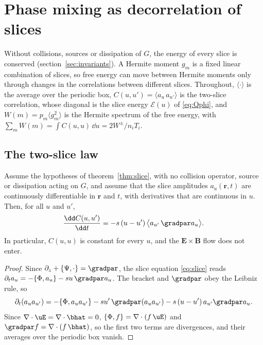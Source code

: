\section{Phase mixing as decorrelation of slices}\label{sec:decorrelation}

Without collisions, sources or dissipation of $G$, the energy of every slice is conserved (section~\ref{sec:invariants}). A Hermite moment $g_m$ is a fixed linear combination of slices, so free energy can move between Hermite moments only through changes in the correlations between different slices. Throughout, $\langle\cdot\rangle$ is the average over the periodic box, $C(u,u')=\langle a_u\,a_{u'}\rangle$ is the two-slice correlation, whose diagonal is the slice energy $\mathcal E(u)$ of \eqref{eq:Qphi}, and $W(m)=p_m\langle g_m^2\rangle$ is the Hermite spectrum of the free energy, with $\sum_mW(m)=\int C(u,u)\,\dd u=2W^\pm/n_iT_i$.

\subsection{The two-slice law}\label{dec:sec-twoslice}

\begin{proposition}\label{prop:twoslice}
Assume the hypotheses of theorem~\ref{thm:slice}, with no collision operator, source or dissipation acting on $G$, and assume that the slice amplitudes $a_u(\boldsymbol r,t)$ are continuously differentiable in $\boldsymbol r$ and $t$, with derivatives that are continuous in $u$. Then, for all $u$ and $u'$,
\begin{equation}\label{eq:twoslice}
  \frac{\dd C(u,u')}{\dd t}=-s\,(u-u')\,\big\langle a_{u'}\,\gradpar a_u\big\rangle .
\end{equation}
In particular, $C(u,u)$ is constant for every $u$, and the $\boldsymbol E\times\boldsymbol B$ flow does not enter.
\end{proposition}

\begin{proof}
Since $\partial_z+\{\Psi,\cdot\}=\gradpar$, the slice equation \eqref{eq:slice} reads $\partial_ta_u=-\{\Phi,a_u\}-su\,\gradpar a_u$. The bracket and $\gradpar$ obey the Leibniz rule, so
\begin{equation*}
  \partial_t(a_ua_{u'})=-\{\Phi,a_ua_{u'}\}-su'\,\gradpar(a_ua_{u'})-s\,(u-u')\,a_{u'}\gradpar a_u .
\end{equation*}
Since $\nabla\cdot\uE=\nabla\cdot\bhat=0$, $\{\Phi,f\}=\nabla\cdot(f\,\uE)$ and $\gradpar f=\nabla\cdot(f\,\bhat)$, so the first two terms are divergences, and their averages over the periodic box vanish.
\end{proof}

